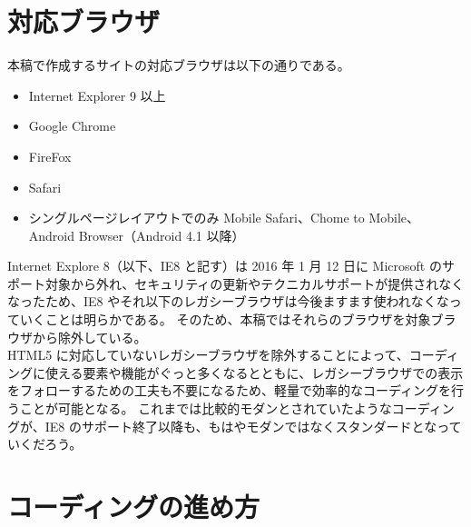 \section{対応ブラウザ}
本稿で作成するサイトの対応ブラウザは以下の通りである。
\begin{itemize}\setlength{\leftskip}{-1.00zw}%
\item Internet Explorer 9 以上
\item Google Chrome
\item FireFox
\item Safari
\item シングルページレイアウトでのみ Mobile Safari、Chome to Mobile、Android Browser（Android 4.1 以降）
\end{itemize}
Internet Explore 8（以下、IE8 と記す）は 2016 年 1 月 12 日に Microsoft のサポート対象から外れ、セキュリティの更新やテクニカルサポートが提供されなくなったため、IE8 やそれ以下のレガシーブラウザは今後ますます使われなくなっていくことは明らかである。
そのため、本稿ではそれらのブラウザを対象ブラウザから除外している。\\

HTML5 に対応していないレガシーブラウザを除外することによって、コーディングに使える要素や機能がぐっと多くなるとともに、レガシーブラウザでの表示をフォローするための工夫も不要になるため、軽量で効率的なコーディングを行うことが可能となる。
これまでは比較的モダンとされていたようなコーディングが、IE8 のサポート終了以降も、もはやモダンではなくスタンダードとなっていくだろう。\\
\section{コーディングの進め方}
